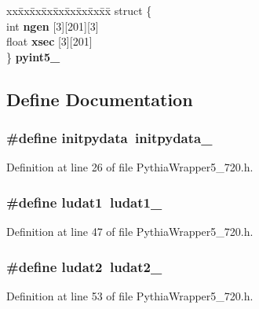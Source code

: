 \begin{CompactItemize}
\begin{tabbing}
\end{tabbing}\item 
\begin{tabbing}
xx\=xx\=xx\=xx\=xx\=xx\=xx\=xx\=xx\=\kill
struct \{\\
\>int {\bf ngen} [3][201][3]\\
\>float {\bf xsec} [3][201]\\
\} {\bf pyint5\_}\\

\end{tabbing}\end{CompactItemize}


\subsection{Define Documentation}
\subsubsection{\setlength{\rightskip}{0pt plus 5cm}\#define initpydata~initpydata\_\-}\label{PythiaWrapper5__720_8h_8f6480836f44533427a09e5f8f4150ad}




Definition at line 26 of file Pythia\-Wrapper5\_\-720.h.
\subsubsection{\setlength{\rightskip}{0pt plus 5cm}\#define ludat1~{\bf ludat1\_\-}}\label{PythiaWrapper5__720_8h_9658744dc3952e2fa984162c457e95b4}




Definition at line 47 of file Pythia\-Wrapper5\_\-720.h.
\subsubsection{\setlength{\rightskip}{0pt plus 5cm}\#define ludat2~{\bf ludat2\_\-}}\label{PythiaWrapper5__720_8h_df81a1c0a01bfa96b3e9e23c33e163f3}




Definition at line 53 of file Pythia\-Wrapper5\_\-720.h.
